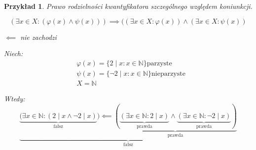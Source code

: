 \documentclass[a5paper,8pt]{article}
\theoremstyle{mythmstyle}
\newtheorem*{example}{Przykład}
\begin{document}
            \begin{example}
                Prawo rodzielności kwantyfikatora szczególnego względem koniunkcji.

                \begin{equation*}
                    (\exists x \in X : ( \varphi(x) \wedge \psi(x))) \implies ((\exists x \in X : \varphi(x)) \wedge (\exists x \in X : \psi(x))
                \end{equation*}

                \begin{center}
                    $ \impliedby $ nie zachodzi
                \end{center}

                Niech:
                \begin{equation*}
                    \begin{aligned}
                        & \varphi(x) = \{ 2 \mid x : x \in \mathbb{N} \} \text{parzyste}\\
                        & \psi(x) = \{ \neg 2 \mid x : x \in \mathbb{N} \} \text{nieparzyste} \\
                        & X = \mathbb{N}
                    \end{aligned}
                \end{equation*}

                Wtedy:
                \begin{equation*}
                    \underbrace{\underbrace{(\exists x \in \mathbb{N} : (2\mid x \wedge \neg 2\mid x )}_{\text{fałsz}})
                    \impliedby \underbrace{(\underbrace{(\exists x \in \mathbb{N} : 2 \mid x)}_{\text{prawda}} \wedge \underbrace{(\exists x \in \mathbb{N} : \neg 2 \mid x)}_{\text{prawda}})}_{\text{prawda}}}_{\text{fałsz}}
                \end{equation*}

            \end{example}
\end{document}
